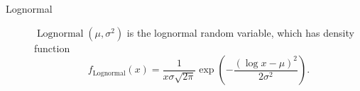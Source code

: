 \documentclass{article}
\DeclareMathOperator{\Lognormal}{Lognormal}
\begin{document}
\begin{description}
\item[Lognormal] $\Lognormal(\mu, \sigma^2)$ is the lognormal random
  variable, which has density function
  \begin{equation}
    f_{\Lognormal}(x) = \frac{1}{x \sigma \sqrt{2 \pi}}
    \exp\left(- \frac{\left(\log x - \mu\right)^2}{2 \sigma^2}\right).
  \end{equation}
\end{description}




\end{document}
